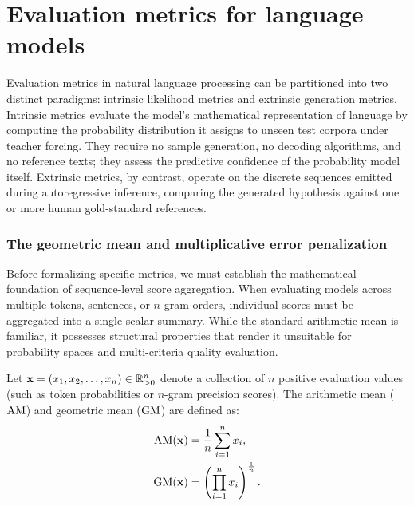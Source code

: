 \documentclass[../../main.tex]{subfiles}
\begin{document}
\clearpage

\section{Evaluation metrics for language models}
\label{sec:evaluation_metrics}

Evaluation metrics in natural language processing can be partitioned into two distinct paradigms: intrinsic likelihood metrics and extrinsic generation metrics. Intrinsic metrics evaluate the model's mathematical representation of language by computing the probability distribution it assigns to unseen test corpora under teacher forcing. They require no sample generation, no decoding algorithms, and no reference texts; they assess the predictive confidence of the probability model itself. Extrinsic metrics, by contrast, operate on the discrete sequences emitted during autoregressive inference, comparing the generated hypothesis against one or more human gold-standard references.

\subsubsection{The geometric mean and multiplicative error penalization}
Before formalizing specific metrics, we must establish the mathematical foundation of sequence-level score aggregation. When evaluating models across multiple tokens, sentences, or $n$-gram orders, individual scores must be aggregated into a single scalar summary. While the standard arithmetic mean is familiar, it possesses structural properties that render it unsuitable for probability spaces and multi-criteria quality evaluation.

Let $\mathbf{x} = (x_1, x_2, \dots, x_n) \in \mathbb{R}_{>0}^n$ denote a collection of $n$ positive evaluation values (such as token probabilities or $n$-gram precision scores). The arithmetic mean ($\mathrm{AM}$) and geometric mean ($\mathrm{GM}$) are defined as:
\begin{align}
\label{eq:arithmetic_mean_def}
\mathrm{AM}(\mathbf{x}) &= \frac{1}{n} \sum_{i=1}^n x_i, \\
\label{eq:geometric_mean_def}
\mathrm{GM}(\mathbf{x}) &= \left( \prod_{i=1}^n x_i \right)^{\frac{1}{n}}.
\end{align}
\end{document}
